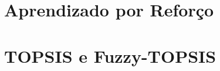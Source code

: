 \section{Aprendizado por Reforço}
\label{sec:aprendizado-por-reforco}


\section{TOPSIS e Fuzzy-TOPSIS}
\label{sec:topsis-fuzzy-topsis}









	
